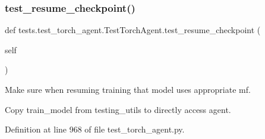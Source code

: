 \subsubsection{\texorpdfstring{test\+\_\+resume\+\_\+checkpoint()}{test\_resume\_checkpoint()}}
{\footnotesize\ttfamily def tests.\+test\+\_\+torch\+\_\+agent.\+Test\+Torch\+Agent.\+test\+\_\+resume\+\_\+checkpoint (\begin{DoxyParamCaption}\item[{}]{self }\end{DoxyParamCaption})}

\begin{DoxyVerb}Make sure when resuming training that model uses appropriate mf.

Copy train_model from testing_utils to directly access agent.
\end{DoxyVerb}
 

Definition at line 968 of file test\+\_\+torch\+\_\+agent.\+py.


